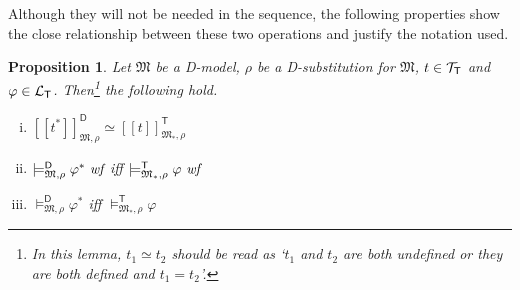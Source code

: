 \documentclass{article}
\newtheorem{proposition}[definition]{Proposition}
\newcommand{\D}{\textsf D}
\newcommand{\starfun}[1]{\ensuremath{{#1}^\ast}}
\newcommand{\modelfunm}[1]{\ensuremath{\mathfrak{#1}_\ast}}
\newcommand{\wf}{\ \mbox{\em wf}}
\newcommand{\lang}[1]{\ensuremath{{\cal L}_{\mathsf{#1}}}}
\newcommand{\terms}[1]{\ensuremath{{\cal T}_{\mathsf{#1}}}}
\newcommand{\ints}[4]{\ensuremath{[\![{#4}]\!]^{\mathsf{#1}}_{\mathfrak{#2},{#3}}}}
\newcommand{\mymodelss}[3]{\ensuremath{\models_{\mathfrak{#2},{#3}}^{\mathsf{#1}}}}
\begin{document}
Although they will not be needed in the sequence, the following properties
show the close relationship between these two operations and justify the
notation used.
\begin{proposition}\label{starfunprops}
Let $\mathfrak M$ be a {\D}-model, $\rho$ be a {\D}-substitution for
$\mathfrak M$, $t\in\terms{T}$ and $\varphi\in\lang{T}$.
Then\footnote{In this lemma, $t_1\simeq t_2$ should be read as `$t_1$ and
$t_2$ are both undefined or they are both defined and $t_1=t_2$'.} the
following hold.
\begin{enumerate}[(i)]
\item $\ints{D}M\rho{\starfun t}\simeq\ints{T}{\modelfunm M}\rho{t}$
\item $\mymodelss{D}M\rho\starfun\varphi\wf$ iff
$\mymodelss{T}{\modelfunm M}\rho\varphi\wf$
\item $\mymodelss{D}M\rho\starfun\varphi$ iff
$\mymodelss{T}{\modelfunm M}\rho\varphi$
\end{enumerate}
\end{proposition}
\end{document}
